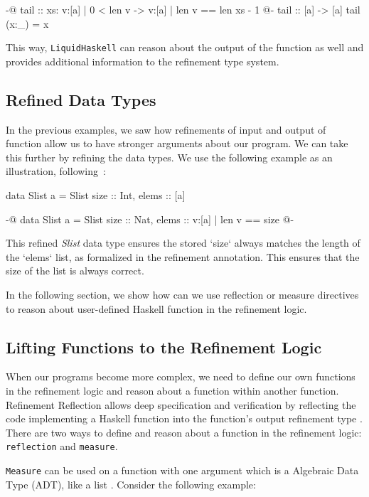 \documentclass[]{rptuseminar}
\begin{document}
\begin{haskell}
 {-@ tail :: xs: {v:[a] | 0 < len v} -> {v:[a] | len v == len xs - 1} @-}
 tail :: [a] -> [a]
 tail (x:_) = x
\end{haskell}

This way, \texttt{LiquidHaskell} can reason about the output of the 
function as well and provides additional information to the refinement type system.


\subsection{Refined Data Types}
In the previous examples, we saw how refinements of input and output of function allow us to have stronger arguments about our program. 
We can take this further by refining the data types. 
We use the following example as an illustration, following~\cite{jhala_programming_2020}:
\begin{haskell}
  data Slist a = Slist { size :: Int, elems :: [a] }

  {-@ data Slist a = Slist { size :: Nat, elems :: {v:[a] | len v == size} } @-}
\end{haskell}

This refined \textit{Slist} data type ensures the stored `size` always matches the length of the `elems` list, 
as formalized in the refinement annotation. 
This ensures that the size of the list is always correct.

In the following section, we show how can we use reflection or measure directives to reason about user-defined Haskell function in the refinement logic.

\subsection{Lifting Functions to the Refinement Logic}
\label{sec:reflection}
When our programs become more complex, we need to define our own functions in the refinement logic and reason about
a function within another function. Refinement Reflection allows deep specification and verification by 
reflecting the code implementing a Haskell function into the function’s output refinement type \cite{niki_blog_2016}.
There are two ways to define and reason about a function in the refinement logic: \texttt{reflection} and \texttt{measure}. 

\texttt{Measure} can be used on a function with one argument which is a Algebraic Data Type (ADT), like a list \cite{niki_lecture_2024}. 
Consider the following example:
\end{document}
